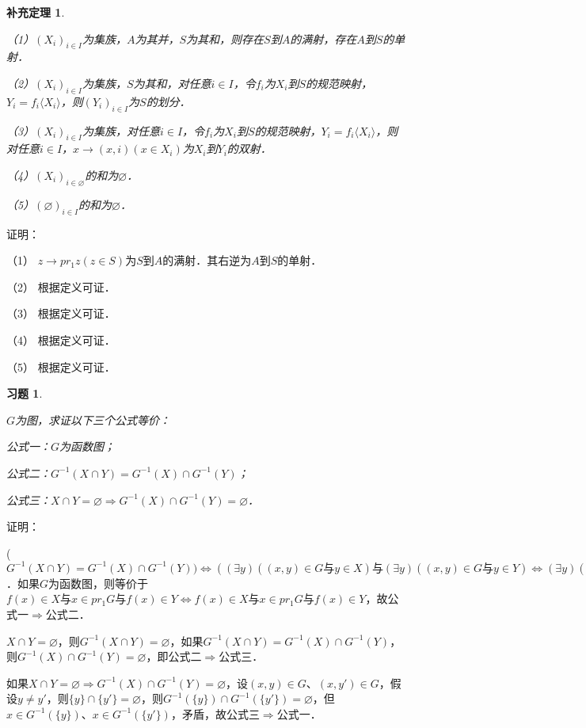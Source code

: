 \documentclass[12pt, a4paper, oneside]{book}
\newtheorem{cor}{补充定理}
\newtheorem{exer}{习题}
\begin{document}
			\begin{cor}\label{cor116}
				\hfill\par
				（1）$(X_i)_{i\in I}$为集族，$A$为其并，$S$为其和，则存在$S$到$A$的满射，存在$A$到$S$的单射．
				\par
				（2）$(X_i)_{i\in I}$为集族，$S$为其和，对任意$i\in I$，令$f_i$为$X_i$到$S$的规范映射，$Y_i=f_i\langle X_i\rangle$，则$(Y_i)_{i\in I}$为$S$的划分．
				\par
				（3）$(X_i)_{i\in I}$为集族，对任意$i\in I$，令$f_i$为$X_i$到$S$的规范映射，$Y_i=f_i\langle X_i\rangle$，则对任意$i\in I$，$x\to (x, i)(x\in X_i)$为$X_i$到$Y_i$的双射．
				\par
				（4）$(X_i)_{i\in \varnothing}$的和为$\varnothing$．
				\par
				（5）$(\varnothing)_{i\in I}$的和为$\varnothing$．
			\end{cor}
			证明：
			\par
			（1）	$z\to pr_1z(z\in S)$为$S$到$A$的满射．其右逆为$A$到$S$的单射．
			\par
			（2）	根据定义可证．
			\par
			（3）	根据定义可证．
			\par
			（4）	根据定义可证．
			\par
			（5）	根据定义可证．

			\begin{exer}\label{exer54}
				\hfill\par
				$G$为图，求证以下三个公式等价：
				\par
				公式一：$G$为函数图；
				\par
				公式二：$G^{-1}(X\cap Y)=G^{-1}(X)\cap G^{-1}(Y)$；
				\par
				公式三：$X\cap Y=\varnothing\Rightarrow G^{-1}(X)\cap G^{-1}(Y)=\varnothing$．
			\end{exer}
			证明：
			\par
			($G^{-1}(X\cap Y)= G^{-1}(X)\cap G^{-1}(Y))\Leftrightarrow ((\exists y)((x, y)\in G\text{与}y\in X)\text{与}(\exists y)((x, y)\in G\text{与}y\in Y)\Leftrightarrow (\exists y) ((x, y)\in G\text{与}y\in X\text{与}y\in Y))$．如果$G$为函数图，则等价于$f(x)\in X\text{与}x\in pr_1G\text{与}f(x)\in Y\Leftrightarrow f(x)\in X\text{与}x\in pr_1G\text{与}f(x)\in Y$，故公式一$\Rightarrow$公式二．
			\par
			$X\cap Y=\varnothing$，则$G^{-1}(X\cap Y)=\varnothing$，如果$G^{-1}(X\cap Y)=G^{-1}(X)\cap G^{-1}(Y)$，则$G^{-1}(X)\cap G^{-1}(Y)=\varnothing$，即公式二$\Rightarrow$公式三．
			\par
			如果$X\cap Y=\varnothing\Rightarrow G^{-1}(X)\cap G^{-1}(Y)=\varnothing$，设$(x, y)\in G$、$(x, y')\in G$，假设$y\neq y'$，则$\{y\}\cap \{y'\}=\varnothing$，则$G^{-1}(\{y\})\cap G^{-1}(\{y'\})=\varnothing$，但$x\in G^{-1}(\{y\})$、$x\in G^{-1}(\{y'\})$，矛盾，故公式三$\Rightarrow$公式一．
			
\end{document}
